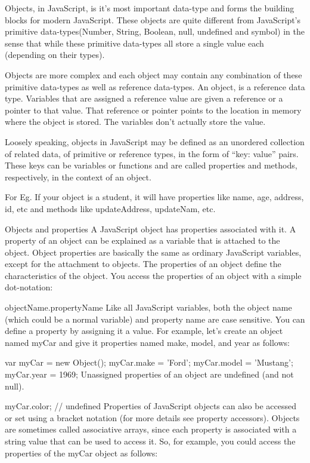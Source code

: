 Objects, in JavaScript, is it’s most important data-type and forms the building blocks for modern JavaScript. These objects are quite different from JavaScript’s primitive data-types(Number, String, Boolean, null, undefined and symbol) in the sense that while these primitive data-types all store a single value each (depending on their types).

Objects are more complex and each object may contain any combination of these primitive data-types as well as reference data-types.
An object, is a reference data type. Variables that are assigned a reference value are given a reference or a pointer to that value. That reference or pointer points to the location in memory where the object is stored. The variables don’t actually store the value.

Loosely speaking, objects in JavaScript may be defined as an unordered collection of related data, of primitive or reference types, in the form of “key: value” pairs. These keys can be variables or functions and are called properties and methods, respectively, in the context of an object.

For Eg. If your object is a student, it will have properties like name, age, address, id, etc and methods like updateAddress, updateNam, etc.

Objects and properties
A JavaScript object has properties associated with it. A property of an object can be explained as a variable that is attached to the object. Object properties are basically the same as ordinary JavaScript variables, except for the attachment to objects. The properties of an object define the characteristics of the object. You access the properties of an object with a simple dot-notation:

objectName.propertyName
Like all JavaScript variables, both the object name (which could be a normal variable) and property name are case sensitive. You can define a property by assigning it a value. For example, let’s create an object named myCar and give it properties named make, model, and year as follows:

var myCar = new Object();
myCar.make = 'Ford';
myCar.model = 'Mustang';
myCar.year = 1969;
Unassigned properties of an object are undefined (and not null).

myCar.color; // undefined
Properties of JavaScript objects can also be accessed or set using a bracket notation (for more details see property accessors). Objects are sometimes called associative arrays, since each property is associated with a string value that can be used to access it. So, for example, you could access the properties of the myCar object as follows:

